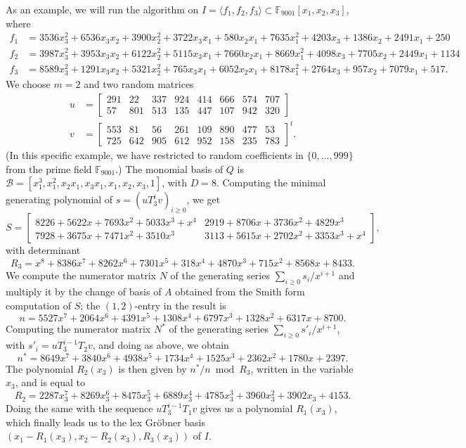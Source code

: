 \documentclass[12pt]{article}
\begin{document}
As an example, we will run the algorithm on $I = \langle f_1, f_2, f_3 \rangle \subset \mathbb{F}_{9001}[x_1,x_2,x_3]$,
where
{\small
\begin{align*}
f_1 &= 3536x_3^2 +6536x_3x_2 + 3900x_2^2 + 3722x_3x_1 + 580x_2x_1 + 7635x_1^2 + 4203x_3 + 1386x_2 + 2491x_1 + 250\\
f_2 &= 3987x_3^2 + 3953x_3x_2 +6122x_2^2 +5115x_3x_1 +7660x_2x_1 +8669x_1^2 + 4098x_3 +7705x_2 + 2449x_1 + 1134\\
f_3 &= 8589x_3^2 + 1291x_3x_2 +5321x_2^2 + 765x_3x_1 +6052x_2x_1 +8178x_1^2 + 2764x_3 + 957x_2 +7079x_1 + 517.
\end{align*}
}%
We choose $m = 2$ and two random matrices
\begin{align*}
u &= \begin{bmatrix}
291&  22& 337& 924& 414& 666& 574& 707\\
57& 801& 513& 135& 447& 107& 942& 320
\end{bmatrix}\\
v &= \begin{bmatrix}
553&  81&  56& 261& 109& 890& 477&  53\\
725& 642& 905& 612& 952& 158& 235& 783
\end{bmatrix} ^ {t} .
\end{align*}
(In this specific example, we have restricted to random coefficients in $\{0,\ldots,999\}$ from the prime field $\mathbb{F}_{9001}$.)
The monomial basis of $Q$ is $\mathscr{B}=[x_1^3, x_1^2, x_2x_1, x_3x_1, x_1, x_2, x_3, 1]$, with $D = 8$. 
Computing the minimal generating polynomial of $s=(u T_3^i v)_{i\ge 0}$, we get
$$S= \begin{bmatrix}
8226 + 5622x + 7693x^2 + 5033x^3 + x^4&     2919 + 8706x + 3736x^2 + 4829x^3\\
7928 + 3675x + 7471x^2 + 3510x^3  &        3113 + 5615x + 2702x^2 + 3353x^3 + x^4
\end{bmatrix},$$
with determinant
$$R_3 =x^8 + 8386x^7 + 8262x^6 + 7301x^5 + 318x^4 + 4870x^3 + 715x^2 + 8568x + 8433.$$
We compute the numerator matrix $N$ of the generating series $\sum_{i \ge 0} s_i/x^{i+1}$
and multiply it by the change of basis of $A$ obtained from the Smith form computation of 
$S$; the $(1,2)$-entry in the result is
$$n = 5527x^7 + 2064x^6 + 4391x^5 + 1308x^4 + 6797x^3 + 1328x^2 + 6317x + 8700.$$
Computing the numerator matrix $N^*$ of the generating series $\sum_{i \ge 0} s'_i/x^{i+1}$,
with $s'_i = uT_3^{i-1} T_2 v$, and doing as above, we obtain
$$n^* = 8649x^7 + 3840x^6 + 4938x^5 + 1734x^4 + 1525x^3 + 2362x^2 + 1780x + 2397.$$
The polynomial $R_2(x_3)$ is then given by $n^*/n \bmod R_3$, written in the variable
$x_3$, and
is equal to 
$$R_2 = 2287x_3^7 + 8269x_3^6 + 8475x_3^5 + 6889x_3^4 + 4785x_3^3 + 3960x_3^2 + 3902x_3 + 4153.$$
Doing the same with the sequence $uT_3^{i-1} T_1 v$ gives us a polynomial $R_1(x_3)$,
which finally leads us to the lex Gr\"obner basis $(x_1-R_1(x_3), x_2-R_2(x_3),R_3(x_3))$
of $I$.
\end{document}
